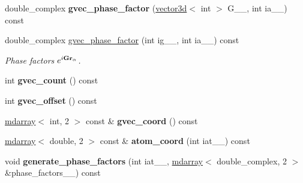\begin{DoxyCompactItemize}
\item 
\hypertarget{classsirius_1_1_simulation__context_a577960ee4a0b4eda502dc5a1a0438b4a}{}double\+\_\+complex {\bfseries gvec\+\_\+phase\+\_\+factor} (\hyperlink{classgeometry3d_1_1vector3d}{vector3d}$<$ int $>$ G\+\_\+\+\_\+, int ia\+\_\+\+\_\+) const \label{classsirius_1_1_simulation__context_a577960ee4a0b4eda502dc5a1a0438b4a}

\item 
double\+\_\+complex \hyperlink{classsirius_1_1_simulation__context_a144edd7af13fbf0ba11097e1983f0206}{gvec\+\_\+phase\+\_\+factor} (int ig\+\_\+\+\_\+, int ia\+\_\+\+\_\+) const 
\begin{DoxyCompactList}\small\item\em Phase factors $ e^{i {\bf G} {\bf r}_{\alpha}} $. \end{DoxyCompactList}\item 
\hypertarget{classsirius_1_1_simulation__context_a363313ea8721fccddebaf4a24b9e2f38}{}int {\bfseries gvec\+\_\+count} () const \label{classsirius_1_1_simulation__context_a363313ea8721fccddebaf4a24b9e2f38}

\item 
\hypertarget{classsirius_1_1_simulation__context_ad13757fe8fc6a26652ff50ad8635524f}{}int {\bfseries gvec\+\_\+offset} () const \label{classsirius_1_1_simulation__context_ad13757fe8fc6a26652ff50ad8635524f}

\item 
\hypertarget{classsirius_1_1_simulation__context_a2c531460df77616f9ab7583344b275fe}{}\hyperlink{classsddk_1_1mdarray}{mdarray}$<$ int, 2 $>$ const \& {\bfseries gvec\+\_\+coord} () const \label{classsirius_1_1_simulation__context_a2c531460df77616f9ab7583344b275fe}

\item 
\hypertarget{classsirius_1_1_simulation__context_a3c8d53ca8759f9d591d84034523f75a0}{}\hyperlink{classsddk_1_1mdarray}{mdarray}$<$ double, 2 $>$ const \& {\bfseries atom\+\_\+coord} (int iat\+\_\+\+\_\+) const \label{classsirius_1_1_simulation__context_a3c8d53ca8759f9d591d84034523f75a0}

\item 
\hypertarget{classsirius_1_1_simulation__context_a705636bd7c3b5458bd0d9c9420771172}{}void {\bfseries generate\+\_\+phase\+\_\+factors} (int iat\+\_\+\+\_\+, \hyperlink{classsddk_1_1mdarray}{mdarray}$<$ double\+\_\+complex, 2 $>$ \&phase\+\_\+factors\+\_\+\+\_\+) const \label{classsirius_1_1_simulation__context_a705636bd7c3b5458bd0d9c9420771172}


\end{DoxyCompactItemize}
